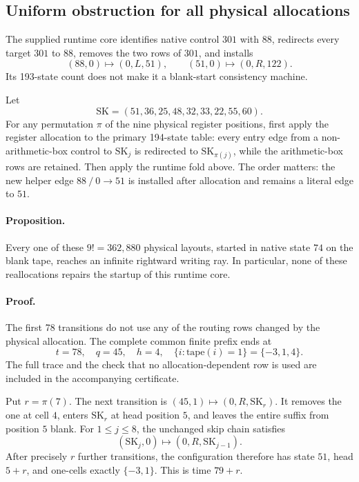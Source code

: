 \subsection{Uniform obstruction for all physical allocations}
\label{sec:runtime193-all-layouts}

The supplied runtime core identifies native control \(301\) with \(88\),
redirects every target \(301\) to \(88\), removes the two rows of \(301\),
and installs
\[
 (88,0)\mapsto(0,L,51),\qquad (51,0)\mapsto(0,R,122).
\]
Its 193-state count does not make it a blank-start consistency machine.

Let
\[
 \mathrm{SK}=(51,36,25,48,32,33,22,55,60).
\]
For any permutation \(\pi\) of the nine physical register positions, first
apply the register allocation to the primary 194-state table: every
entry edge from a non-arithmetic-box control to \(\mathrm{SK}_j\) is
redirected to \(\mathrm{SK}_{\pi(j)}\), while the arithmetic-box rows are
retained. Then apply the runtime fold above. The order matters:
the new helper edge \(88\mathbin{/}0\to51\) is installed after allocation
and remains a literal edge to \(51\).

\paragraph{Proposition.}
Every one of these \(9!=362{,}880\) physical layouts, started in native
state \(74\) on the blank tape, reaches an infinite rightward writing
ray. In particular, none of these reallocations repairs the startup
of this runtime core.

\paragraph{Proof.}
The first 78 transitions do not use any of the routing rows changed by
the physical allocation. The complete common finite prefix ends at
\[
 t=78,\quad q=45,\quad h=4,\quad
             \{i:\mathrm{tape}(i)=1\}=\{-3,1,4\}.
\]
The full trace and the check that no allocation-dependent row is used
are included in the accompanying certificate.

Put \(r=\pi(7)\). The next transition is
\((45,1)\mapsto(0,R,\mathrm{SK}_{r})\).
It removes the one at cell \(4\), enters \(\mathrm{SK}_{r}\) at head
position \(5\), and leaves the entire suffix from position \(5\) blank.
For \(1\le j\le8\), the unchanged skip chain satisfies
\[
  (\mathrm{SK}_{j},0)\mapsto(0,R,\mathrm{SK}_{j-1}).
\]
After precisely \(r\) further transitions, the configuration therefore
has state \(51\), head \(5+r\), and one-cells exactly \(\{-3,1\}\).
This is time \(79+r\).

